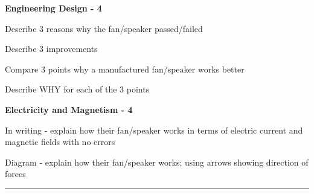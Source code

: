 \documentclass[14pt, fleqn, paper=letter, oneside]{scrartcl}
\begin{document}
\begin{minipage}[t]{0.48\textwidth}
\hfill \textbf{Engineering Design - 4}\hfill\mbox{}

\vspace{-4mm}
\begin{checklist}[leftmargin=*]
\item Describe 3 reasons why the fan/speaker passed/failed
\item Describe 3 improvements
\item Compare 3 points why a manufactured fan/speaker works better
\item Describe WHY for each of the 3 points

\end{checklist}

\end{minipage}
\hfill\vline\hfill
\begin{minipage}[t]{0.48\textwidth}
\hfill \textbf{Electricity and Magnetism - 4}\hfill\mbox{}

\vspace{-4mm}
\begin{checklist}[leftmargin=*]
\item In writing - explain how their fan/speaker works in terms of electric current and magnetic fields with no errors
\item Diagram - explain how their fan/speaker works; using arrows showing direction of forces

\end{checklist}

\end{minipage}

\vspace{2mm}
\rule{\textwidth}{1pt}
\end{document}

